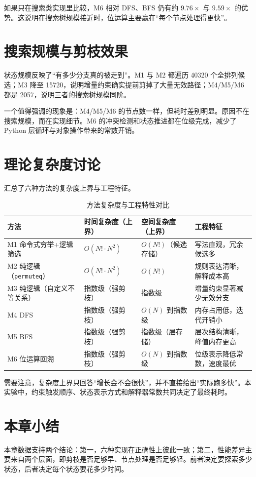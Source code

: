 如果只在搜索类实现里比较，M6 相对 DFS、BFS 仍有约 $9.76\times$ 与 $9.59\times$ 的优势。这说明在搜索树规模接近时，位运算主要赢在“每个节点处理得更快”。

\section{搜索规模与剪枝效果}

状态规模反映了“有多少分支真的被走到”。M1 与 M2 都遍历 40320 个全排列候选；M3 降至 15720，说明增量约束确实提前剪掉了大量无效路径；M4/M5/M6 都是 2057，说明三者的搜索树规模同阶。

一个值得强调的现象是：M4/M5/M6 的节点数一样，但耗时差别明显。原因不在搜索规模，而在实现细节。M6 的冲突检测和状态推进都在位级完成，减少了 Python 层循环与对象操作带来的常数开销。

\section{理论复杂度讨论}

 汇总了六种方法的复杂度上界与工程特征。

\begin{table}[htbp]
  \centering
  \caption{方法复杂度与工程特性对比}\label{tab:complexity}
  \begin{tabular}{p{2.8cm}p{3.6cm}p{3.4cm}p{3.8cm}}
    \toprule
    方法                        & 时间复杂度（上界）        & 空间复杂度（上界）     & 工程特征          \\
    \midrule
    M1 命令式穷举+逻辑筛选             & $O(N!\cdot N^2)$ & $O(N!)$（候选存储） & 写法直观，冗余候选多    \\
    M2 纯逻辑（\texttt{permuteq}） & $O(N!\cdot N^2)$ & $O(N!)$       & 规则表达清晰，解释成本高  \\
    M3 纯逻辑（自定义不等关系）           & 指数级（强剪枝）         & 指数级           & 增量约束显著减少无效分支  \\
    M4 DFS                    & 指数级（强剪枝）         & $O(N)$ 到指数级   & 内存占用低，迭代开销小   \\
    M5 BFS                    & 指数级（强剪枝）         & 指数级（层存储）      & 层次结构清晰，峰值内存更高 \\
    M6 位运算回溯                  & 指数级（强剪枝）         & $O(N)$ 到指数级   & 位级表示降低常数，速度最优 \\
    \bottomrule
  \end{tabular}
\end{table}

需要注意，复杂度上界只回答“增长会不会很快”，并不直接给出“实际跑多快”。本实验中，约束触发顺序、状态表示方式和解释器常数共同决定了最终耗时。

\section{本章小结}

本章数据支持两个结论：第一，六种实现在正确性上彼此一致；第二，性能差异主要来自两个层面，即剪枝是否足够早、节点处理是否足够轻。前者决定要探索多少状态，后者决定每个状态要花多少时间。
